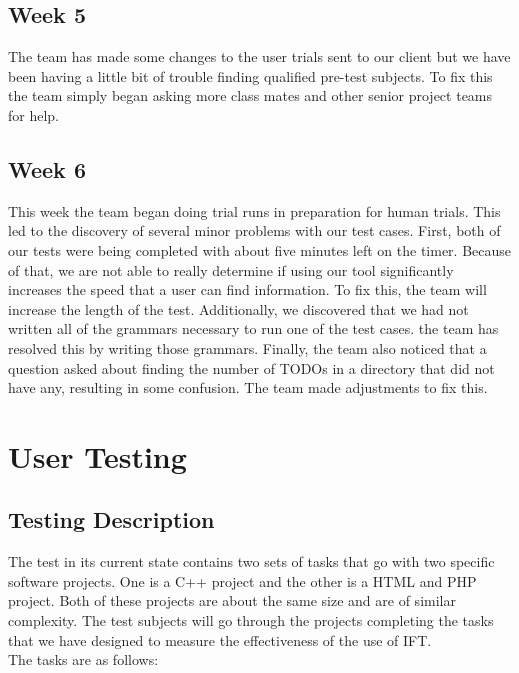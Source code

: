\documentclass[letterpaper,10pt,titlepage,draftclsnofoot,onecolumn,onesided] {IEEEtran}
\begin{document}
	\subsection{Week 5}
	The team has made some changes to the user trials sent to our client but we have been having a little bit of trouble finding qualified pre-test subjects.
	To fix this the team simply began asking more class mates and other senior project teams for help.
	\subsection{Week 6}
	This week the team began doing trial runs in preparation for human trials.
	This led to the discovery of several minor problems with our test cases.
	First, both of our tests were being completed with about five minutes left on the timer.
	Because of that, we are not able to really determine if using our tool significantly increases the speed that a user can find information.
	To fix this, the team will increase the length of the test.
	Additionally, we discovered that we had not written all of the grammars necessary to run one of the test cases. 
	the team has resolved this by writing those grammars.
	Finally, the team also noticed that a question asked about finding the number of TODOs in a directory that did not have any, resulting in some confusion.
	The team made adjustments to fix this.
	
\section{User Testing}
	

	\subsection{Testing Description}
	The test in its current state contains two sets of tasks that go with two specific software projects. 
	One is a C++ project and the other is a HTML and PHP project. 
	Both of these projects are about the same size and are of similar complexity. 
	The test subjects will go through the projects completing the tasks that we have designed to measure the effectiveness of the use of IFT. 
	\\
	The tasks are as follows: 
	
\end{document}
